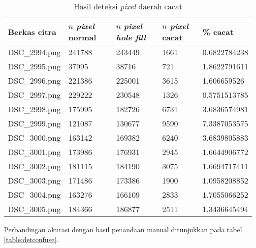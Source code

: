 \documentclass[laporan.tex]{subfiles}
\begin{document}
\begin{table}[h!]
\centering
\begin{tabular}{|l|l|l|l|l|}
\hline
Berkas citra & $n$ \emph{pixel} normal & $n$ \emph{pixel} \emph{hole fill} & $n$ \emph{pixel} cacat & \% cacat \\
\hline
DSC\_2994.png&241788&243449&1661&0.6822784238 \\
DSC\_2995.png&37995&38716&721&1.8622791611 \\
DSC\_2996.png&221386&225001&3615&1.606659526 \\
DSC\_2997.png&229222&230548&1326&0.5751513785 \\
DSC\_2998.png&175995&182726&6731&3.6836574981 \\
DSC\_2999.png&121087&130677&9590&7.3387053575 \\
DSC\_3000.png&163142&169382&6240&3.6839805883 \\
DSC\_3001.png&173986&176931&2945&1.6644906772 \\
DSC\_3002.png&181115&184190&3075&1.6694717411 \\
DSC\_3003.png&171486&173386&1900&1.0958208852 \\
DSC\_3004.png&163276&166109&2833&1.7055066252 \\
DSC\_3005.png&184366&186877&2511&1.3436645494 \\
\hline
\end{tabular}
\caption{Hasil deteksi \emph{pixel} daerah cacat}
\label{table:detrecap}
\end{table}

Perbandingan akurasi dengan hasil penandaan manual ditunjukkan pada tabel \ref{table:detconfuse}.
\end{document}
